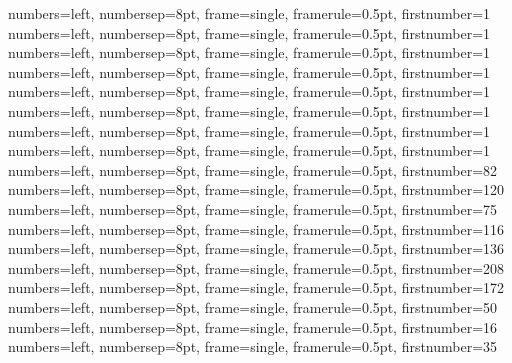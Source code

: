 {numbers=left, numbersep=8pt, frame=single, framerule=0.5pt, firstnumber=1}
{numbers=left, numbersep=8pt, frame=single, framerule=0.5pt, firstnumber=1}
{numbers=left, numbersep=8pt, frame=single, framerule=0.5pt, firstnumber=1}
{numbers=left, numbersep=8pt, frame=single, framerule=0.5pt, firstnumber=1}
{numbers=left, numbersep=8pt, frame=single, framerule=0.5pt, firstnumber=1}
{numbers=left, numbersep=8pt, frame=single, framerule=0.5pt, firstnumber=1}
{numbers=left, numbersep=8pt, frame=single, framerule=0.5pt, firstnumber=1}
{numbers=left, numbersep=8pt, frame=single, framerule=0.5pt, firstnumber=1}
{numbers=left, numbersep=8pt, frame=single, framerule=0.5pt, firstnumber=82}
{numbers=left, numbersep=8pt, frame=single, framerule=0.5pt, firstnumber=120}
{numbers=left, numbersep=8pt, frame=single, framerule=0.5pt, firstnumber=75}
{numbers=left, numbersep=8pt, frame=single, framerule=0.5pt, firstnumber=116}
{numbers=left, numbersep=8pt, frame=single, framerule=0.5pt, firstnumber=136}
{numbers=left, numbersep=8pt, frame=single, framerule=0.5pt, firstnumber=208}
{numbers=left, numbersep=8pt, frame=single, framerule=0.5pt, firstnumber=172}
{numbers=left, numbersep=8pt, frame=single, framerule=0.5pt, firstnumber=50}
{numbers=left, numbersep=8pt, frame=single, framerule=0.5pt, firstnumber=16}
{numbers=left, numbersep=8pt, frame=single, framerule=0.5pt, firstnumber=35}
